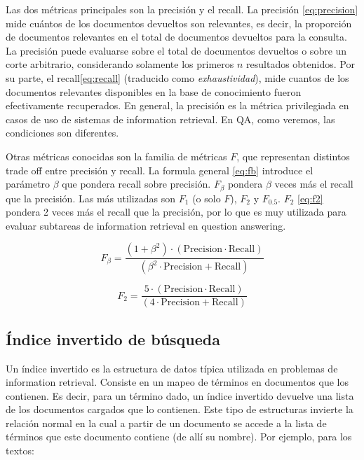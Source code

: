 \medskip

Las dos métricas principales son la precisión y el recall.
La precisión \eqref{eq:precision} mide cuántos de los documentos devueltos son relevantes, es decir, la proporción de documentos relevantes en el total de documentos devueltos para la consulta. La precisión puede evaluarse sobre el total de documentos devueltos o sobre un corte arbitrario, considerando solamente los primeros $n$  resultados obtenidos. Por su parte, el recall\eqref{eq:recall} (traducido como \textit{exhaustividad}), mide cuantos de los documentos relevantes disponibles en la base de conocimiento fueron efectivamente recuperados. En general, la precisión es la métrica privilegiada en casos de uso de sistemas de information retrieval. En QA, como veremos, las condiciones son diferentes.



Otras métricas conocidas son la familia de métricas $F$, que representan distintos trade off entre precisión y recall.
La formula general \eqref{eq:fb} introduce el parámetro $\beta$ que pondera recall sobre precisión. $F_\beta$ pondera $\beta$ veces más el recall que la precisión. Las más utilizadas son $F_1$ (o solo $F$), $F_2$ y $F_{0.5}$. $F_2$ \eqref{eq:f2} pondera 2 veces más el recall que la precisión, por lo que es muy utilizada para evaluar subtareas de information retrieval en question answering.

\begin{equation}\label{eq:fb}
  F_\beta = \frac{(1 + \beta^2) \cdot (\mathrm{Precision} \cdot \mathrm{Recall})}{(\beta^2 \cdot \mathrm{Precision} + \mathrm{Recall})}
\end{equation}


\begin{equation}\label{eq:f2}
  F_2 = \frac{5 \cdot (\mathrm{Precision} \cdot \mathrm{Recall})}{(4 \cdot \mathrm{Precision} + \mathrm{Recall})}
\end{equation}


\subsection{Índice invertido de búsqueda}
\label{subsec:indice-invertido}

Un índice invertido es la estructura de datos típica utilizada en problemas de information retrieval. Consiste en un mapeo de términos en documentos que los contienen. Es decir, para un término dado, un índice invertido devuelve una lista de los documentos cargados que lo contienen. Este tipo de estructuras invierte la relación normal en la cual a partir de un documento se accede a la lista de términos que este documento contiene (de allí su nombre).
Por ejemplo, para los textos:
\medskip


